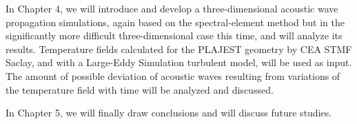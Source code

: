     In Chapter 4, we will introduce and develop a three-dimensional acoustic wave propagation simulations, again based on the spectral-element method but
in the significantly more difficult three-dimensional case this time, and will analyze its results.
Temperature fields calculated for the PLAJEST geometry by CEA STMF Saclay, and with a Large-Eddy Simulation turbulent model, will be used as input.
The amount of possible deviation of acoustic waves resulting from variations of the temperature field with time will be analyzed and discussed.

    In Chapter 5, we will finally draw conclusions and will discuss future studies.

